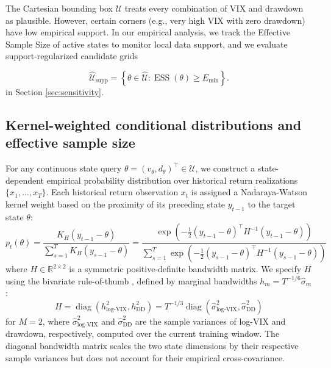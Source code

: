 \documentclass[smallextended]{svjour3}
\begin{document}
\begin{remark}
The Cartesian bounding box $\mathcal{U}$ treats every combination of VIX and drawdown as plausible. However, certain corners (e.g., very high VIX with zero drawdown) have low empirical support. In our empirical analysis, we track the Effective Sample Size of active states to monitor local data support, and we evaluate support-regularized candidate grids

\[
\widehat{\mathcal{U}}_{\text{supp}} = \left\{ \theta\in\widehat{\mathcal{U}}: \operatorname{ESS}(\theta)\ge E_{\min} \right\}.
\] in Section \ref{sec:sensitivity}.
\end{remark}






\subsection{Kernel-weighted conditional distributions and effective sample size}
For any continuous state query $\theta = (v_\theta, d_\theta)^\top \in \mathcal{U}$, we construct a state-dependent empirical probability distribution over historical return realizations $\{x_1, \dots, x_T\}$. Each historical return observation $x_t$ is assigned a Nadaraya-Watson kernel weight \cite{nadaraya1964estimating, watson1964smooth} based on the proximity of its preceding state $y_{t-1}$ to the target state $\theta$:
\begin{equation}
    p_t(\theta) = \frac{K_H(y_{t-1} - \theta)}{\sum_{s=1}^{T} K_H(y_{s-1} - \theta)} = \frac{\exp\left(-\frac{1}{2}(y_{t-1} - \theta)^\top H^{-1} (y_{t-1} - \theta)\right)}{\sum_{s=1}^T \exp\left(-\frac{1}{2}(y_{s-1} - \theta)^\top H^{-1} (y_{s-1} - \theta)\right)}
\end{equation}
where $H \in \mathbb{R}^{2 \times 2}$ is a symmetric positive-definite bandwidth matrix. We specify $H$ using the bivariate rule-of-thumb \citep{silverman1986density}, defined by marginal bandwidths $h_m = T^{-1/6}\hat\sigma_m$:
\begin{equation}
    H = \operatorname{diag}\left(h_{\text{log-VIX}}^2, h_{\text{DD}}^2\right) = T^{-1/3} \operatorname{diag}\left(\hat{\sigma}_{\text{log-VIX}}^2, \hat{\sigma}_{\text{DD}}^2\right)
\end{equation}
for $M = 2$, where $\hat{\sigma}^2_{\log\text{-VIX}}$ and $\hat{\sigma}^2_{\text{DD}}$ are the sample variances of log-VIX and drawdown, respectively, computed over the current training window. The diagonal bandwidth matrix scales the two state dimensions by their respective sample variances but does not account for their empirical cross-covariance.
\end{document}
